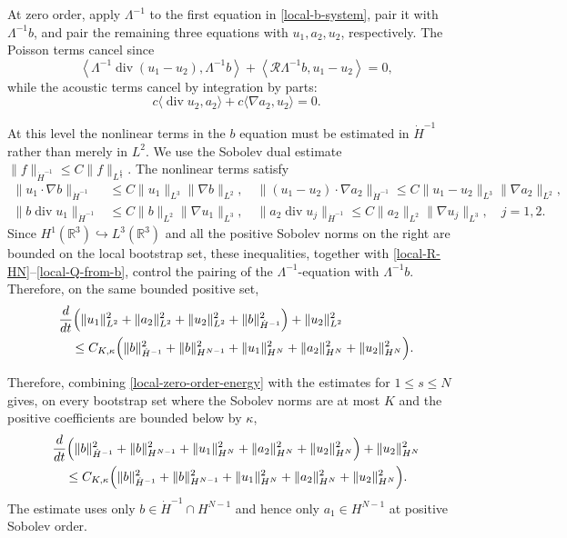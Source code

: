\documentclass[10pt,reqno]{amsart}
\numberwithin{equation}{section}
\begin{document}
At zero order, apply $\Lambda^{-1}$ to the first equation in \eqref{local-b-system}, pair it with $\Lambda^{-1}b$, and pair the remaining three equations with $u_1,a_2,u_2$, respectively. The Poisson terms cancel since
\[
\left\langle \Lambda^{-1}\operatorname{div}(u_1-u_2), \Lambda^{-1}b \right\rangle + \left\langle \mathscr R\Lambda^{-1}b,u_1-u_2 \right\rangle =0,
\]
while the acoustic terms cancel by integration by parts:
\[
c\langle\operatorname{div}u_2,a_2\rangle +c\langle\nabla a_2,u_2\rangle=0.
\]

At this level the nonlinear terms in the $b$ equation must be estimated in $\dot H^{-1}$ rather than merely in $L^2$. We use the Sobolev dual estimate $\|f\|_{\dot H^{-1}} \le C\|f\|_{L^{\frac65}}$. The nonlinear terms satisfy
\begin{align*}
\|u_1\cdot\nabla b\|_{\dot H^{-1}} &\le C\|u_1\|_{L^3}\|\nabla b\|_{L^2},\quad  \|(u_1-u_2)\cdot\nabla a_2\|_{\dot H^{-1}} \le C\|u_1-u_2\|_{L^3}\|\nabla a_2\|_{L^2},\\
\|b\operatorname{div}u_1\|_{\dot H^{-1}} &\le C\|b\|_{L^2}\|\nabla u_1\|_{L^3},\quad \|a_2\operatorname{div}u_j\|_{\dot H^{-1}} \le C\|a_2\|_{L^2}\|\nabla u_j\|_{L^3},
\quad j=1,2.
\end{align*}
Since $H^1(\mathbb R^3)\hookrightarrow L^3(\mathbb R^3)$ and all the positive Sobolev norms on the right are bounded on the local bootstrap set, these inequalities, together with \eqref{local-R-HN}--\eqref{local-Q-from-b}, control the pairing of the $\Lambda^{-1}$-equation with $\Lambda^{-1}b$. Therefore, on the same bounded positive set,
\begin{align}\label{local-zero-order-energy}
\begin{aligned}
&\frac{d}{dt}\Bigl( \|u_1\|_{L^2}^2+\|a_2\|_{L^2}^2+\|u_2\|_{L^2}^2 +\|b\|_{\dot H^{-1}}^2 \Bigr) +\|u_2\|_{L^2}^2\\
&\quad\le C_{K,\kappa}\Bigl( \|b\|_{\dot H^{-1}}^2+\|b\|_{H^{N-1}}^2 +\|u_1\|_{H^N}^2+\|a_2\|_{H^N}^2 +\|u_2\|_{H^N}^2 \Bigr).
\end{aligned}
\end{align}

Therefore, combining \eqref{local-zero-order-energy} with the estimates for $1\le s\le N$ gives, on every bootstrap set where the Sobolev norms are at most $K$ and the positive coefficients are bounded below by $\kappa$,
\begin{align}\label{local-high-energy}
\begin{aligned}
&\frac{d}{dt}\Bigl( \|b\|_{\dot H^{-1}}^2+\|b\|_{H^{N-1}}^2 +\|u_1\|_{H^N}^2+\|a_2\|_{H^N}^2 +\|u_2\|_{H^N}^2 \Bigr) +\|u_2\|_{H^N}^2\\
&\quad\le C_{K,\kappa}\Bigl( \|b\|_{\dot H^{-1}}^2+\|b\|_{H^{N-1}}^2 +\|u_1\|_{H^N}^2+\|a_2\|_{H^N}^2 +\|u_2\|_{H^N}^2 \Bigr).
\end{aligned}
\end{align}
The estimate uses only $b\in\dot H^{-1}\cap H^{N-1}$ and hence only $a_1\in H^{N-1}$ at positive Sobolev order.
\end{document}
